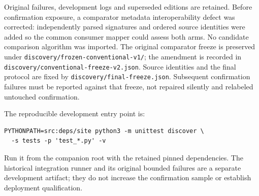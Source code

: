 Original failures, development logs and superseded editions are retained.
Before confirmation exposure, a comparator metadata interoperability defect
was corrected: independently parsed signatures and ordered source identities
were added so the common consumer mapper could assess both arms. No candidate
comparison algorithm was imported. The original comparator freeze is
preserved under \texttt{discovery/frozen-conventional-v1/}; the amendment is
recorded in \texttt{discovery/conventional-freeze-v2.json}. Source identities
and the final protocol are fixed by
\texttt{discovery/final-freeze.json}. Subsequent confirmation failures must be
reported against that freeze, not repaired silently and relabeled untouched
confirmation.

The reproducible development entry point is:
\begin{verbatim}
PYTHONPATH=src:deps/site python3 -m unittest discover \
  -s tests -p 'test_*.py' -v
\end{verbatim}
Run it from the companion root with the retained pinned dependencies.
The historical integration runner and its original bounded failures are a
separate development artifact; they do not increase the confirmation sample
or establish deployment qualification.
